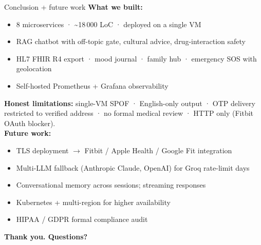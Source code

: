 \documentclass[aspectratio=169,11pt]{beamer}
\begin{document}
\begin{frame}{Conclusion + future work}
  \textbf{What we built:}
  \begin{itemize}\small
    \item 8 microservices · \textasciitilde18\,000 LoC · deployed on a single VM
    \item RAG chatbot with off-topic gate, cultural advice, drug-interaction safety
    \item HL7 FHIR R4 export · mood journal · family hub · emergency SOS with geolocation
    \item Self-hosted Prometheus + Grafana observability
  \end{itemize}
  \textbf{Honest limitations:} single-VM SPOF · English-only output · OTP delivery restricted to verified address · no formal medical review · HTTP only (Fitbit OAuth blocker).\\[6pt]
  \textbf{Future work:}
  \begin{itemize}\small
    \item TLS deployment $\rightarrow$ Fitbit / Apple Health / Google Fit integration
    \item Multi-LLM fallback (Anthropic Claude, OpenAI) for Groq rate-limit days
    \item Conversational memory across sessions; streaming responses
    \item Kubernetes + multi-region for higher availability
    \item HIPAA / GDPR formal compliance audit
  \end{itemize}
  \vfill
  \centering \alert{\textbf{Thank you. Questions?}}
\end{frame}
\end{document}

